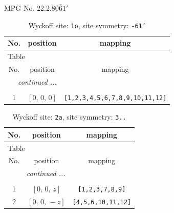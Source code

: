 \documentclass[fleqn,8pt]{jsarticle}
\begin{document}
\setcounter{MaxMatrixCols}{32}

\renewcommand{\tablename}{Table~}
\renewcommand{\figurename}{Figure~}
\begin{center}
\LARGE
MPG No. 22.2.80\quad$\bar{6}1'$
\end{center}
\renewcommand{\arraystretch}{1.2}
\begin{longtable}{ccc}
\caption{Wyckoff site: {\tt 1o}, site symmetry: {\tt -61'}}
 \\
 \hline \hline
No. & position & mapping \\ \hline \endfirsthead

\multicolumn{2}{l}{\tablename\ \thetable{}} \\
 \hline \hline
No. & position & mapping \\ \hline \endhead

 \hline \hline
\multicolumn{2}{r}{\footnotesize\it continued ...} \\ \endfoot

 \hline \hline
\multicolumn{2}{r}{} \\ \endlastfoot

1 & $\left[ 0,\, 0,\, 0 \right]$ & {\tt [1,2,3,4,5,6,7,8,9,10,11,12]} \\
\end{longtable}
\renewcommand{\arraystretch}{1.2}
\begin{longtable}{ccc}
\caption{Wyckoff site: {\tt 2a}, site symmetry: {\tt 3..}}
 \\
 \hline \hline
No. & position & mapping \\ \hline \endfirsthead

\multicolumn{2}{l}{\tablename\ \thetable{}} \\
 \hline \hline
No. & position & mapping \\ \hline \endhead

 \hline \hline
\multicolumn{2}{r}{\footnotesize\it continued ...} \\ \endfoot

 \hline \hline
\multicolumn{2}{r}{} \\ \endlastfoot

1 & $\left[ 0,\, 0,\, z \right]$ & {\tt [1,2,3,7,8,9]} \\ \hline
2 & $\left[ 0,\, 0,\, - z \right]$ & {\tt [4,5,6,10,11,12]} \\
\end{longtable}
\renewcommand{\arraystretch}{1.2}
\end{document}
